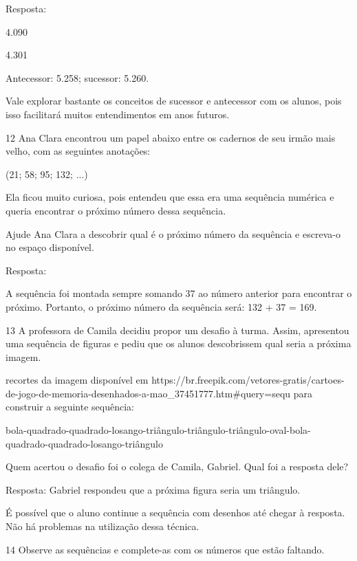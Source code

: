 \begin{escolha}
Resposta:

\begin{escolha}

\item
  4.090
\item
  4.301
\item
  Antecessor: 5.258; sucessor: 5.260.
\end{escolha}

Vale explorar bastante os conceitos de sucessor e antecessor com
os alunos, pois isso facilitará muitos entendimentos em anos futuros.

\num{12} Ana Clara encontrou um papel abaixo entre os cadernos de seu irmão mais velho, com as seguintes anotações:

(21; 58; 95; 132; ...)

Ela ficou muito curiosa, pois entendeu que essa era uma sequência
numérica e queria encontrar o próximo número dessa sequência.

Ajude Ana Clara a descobrir qual é o próximo número da sequência e escreva-o no espaço disponível.


Resposta:

A sequência foi montada sempre somando 37 ao número anterior para
encontrar o próximo. Portanto, o próximo número da sequência será: 132 + 37 = 169.

\num{13} A professora de Camila decidiu propor um desafio à turma. Assim, apresentou uma sequência de figuras e pediu que os alunos descobrissem qual seria a próxima imagem. 

\Usar recortes da imagem disponível em https://br.freepik.com/vetores-gratis/cartoes-de-jogo-de-memoria-desenhados-a-mao_37451777.htm#query=sequ%
para construir a seguinte sequência:

bola-quadrado-quadrado-losango-triângulo-triângulo-triângulo-oval-bola-quadrado-quadrado-losango-triângulo

Quem acertou o desafio foi o colega de Camila, Gabriel. Qual foi a resposta dele?


Resposta:
Gabriel respondeu que a próxima figura seria um triângulo.

É possível que o aluno continue a sequência com desenhos até chegar à resposta. Não há problemas na utilização dessa técnica.


\num{14} Observe as sequências e complete-as com os números que estão faltando.


\end{escolha}
